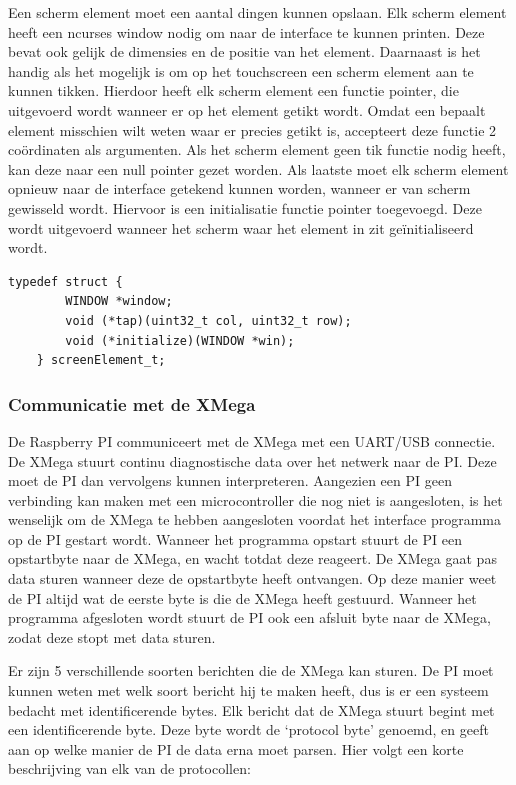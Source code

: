 Een scherm element moet een aantal dingen kunnen opslaan. Elk scherm element heeft een ncurses window nodig om naar de interface te kunnen printen. Deze bevat ook gelijk de dimensies en de positie van het element.
Daarnaast is het handig als het mogelijk is om op het touchscreen een scherm element aan te kunnen tikken. Hierdoor heeft elk scherm element een functie pointer, die uitgevoerd wordt wanneer er op het element getikt wordt. Omdat een bepaalt element misschien wilt weten waar er precies getikt is, accepteert deze functie 2 coördinaten als argumenten. Als het scherm element geen tik functie nodig heeft, kan deze naar een null pointer gezet worden. Als laatste moet elk scherm element opnieuw naar de interface getekend kunnen worden, wanneer er van scherm gewisseld wordt. Hiervoor is een initialisatie functie pointer toegevoegd. Deze wordt uitgevoerd wanneer het scherm waar het element in zit geïnitialiseerd wordt.

\begin{lstlisting}[caption={Het datatype van de scherm elementen},captionpos=b,label={lst:screenElement_t},style=c,xleftmargin=.\textwidth,xrightmargin=.\textwidth]
    typedef struct {
        WINDOW *window;
        void (*tap)(uint32_t col, uint32_t row);
        void (*initialize)(WINDOW *win);
    } screenElement_t;    
\end{lstlisting}

\subsubsection*{Communicatie met de XMega}

De Raspberry PI communiceert met de XMega met een UART/USB connectie. De XMega stuurt continu diagnostische data over het netwerk naar de PI. Deze moet de PI dan vervolgens kunnen interpreteren. Aangezien een PI geen verbinding kan maken met een microcontroller die nog niet is aangesloten, is het wenselijk om de XMega te hebben aangesloten voordat het interface programma op de PI gestart wordt. Wanneer het programma opstart stuurt de PI een opstartbyte naar de XMega, en wacht totdat deze reageert. De XMega gaat pas data sturen wanneer deze de opstartbyte heeft ontvangen. Op deze manier weet de PI altijd wat de eerste byte is die de XMega heeft gestuurd. Wanneer het programma afgesloten wordt stuurt de PI ook een afsluit byte naar de XMega, zodat deze stopt met data sturen.

Er zijn 5 verschillende soorten berichten die de XMega kan sturen. De PI moet kunnen weten met welk soort bericht hij te maken heeft, dus is er een systeem bedacht met identificerende bytes. Elk bericht dat de XMega stuurt begint met een identificerende byte. Deze byte wordt de `protocol byte' genoemd, en geeft aan op welke manier de PI de data erna moet parsen. Hier volgt een korte beschrijving van elk van de protocollen:

